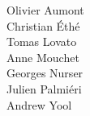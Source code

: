 Olivier Aumont         \\
Christian \'{E}th\'{e} \\
Tomas Lovato           \\
Anne Mouchet           \\
Georges Nurser         \\
Julien Palmi\'{e}ri    \\
Andrew Yool
